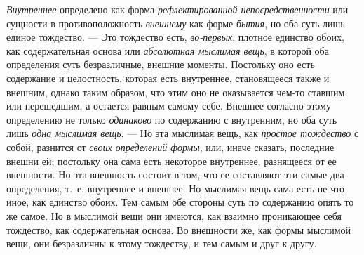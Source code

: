 {\em Внутреннее} определено как форма
{\em рефлектированной непосредственности} или сущности
в противоположность {\em внешнему} как форме
{\em бытия}, но оба суть лишь единое тождество. — Это
тождество есть, {\em во-первых}, плотное единство
обоих, как содержательная основа или {\em абсолютная
мыслимая вещь}, в которой оба определения суть безразличные, внешние
моменты. Постольку оно есть содержание и целостность, которая есть
внутреннее, становящееся также и внешним, однако таким образом, что этим
оно не оказывается чем-то ставшим или перешедшим, а остается равным самому
себе. Внешнее согласно этому определению не только
{\em одинаково} по содержанию с внутренним, но оба суть
лишь {\em одна мыслимая вещь}. — Но эта мыслимая вещь,
как {\em простое тождество} с собой, разнится от
{\em своих определений формы}, или, иначе сказать,
последние внешни ей; постольку она сама есть некоторое внутреннее,
разнящееся от ее внешности. Но эта внешность состоит в том, что ее
составляют эти самые два определения, т.~е. внутреннее и внешнее. Но
мыслимая вещь сама есть не что иное, как единство обоих. Тем самым обе
стороны суть по содержанию опять то же самое. Но в мыслимой вещи они
имеются, как взаимно проникающее себя тождество, как содержательная основа.
Во внешности же, как формы мыслимой вещи, они безразличны к этому
тождеству, и тем самым и друг к другу.

